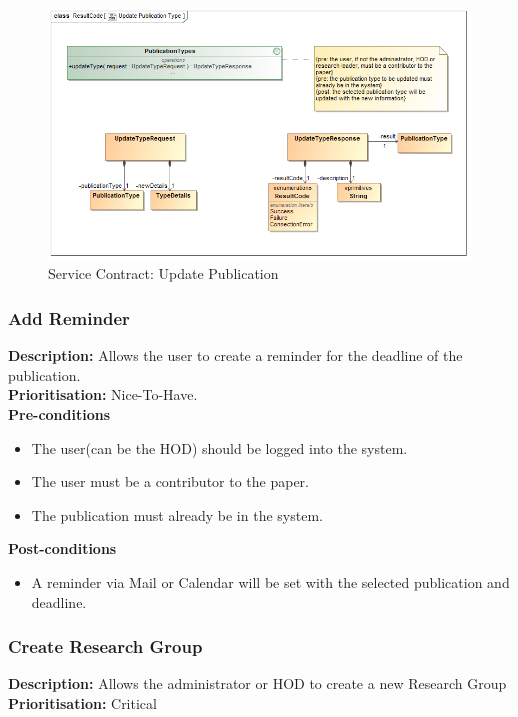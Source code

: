 \documentclass[a4paper]{article}
\begin{document}
            \begin{figure}[H]
            	\centering
            	\includegraphics[width=\textwidth]{5.1.9.Update.Publication.Type.Services.Contract.png}
            	\caption{Service Contract: Update Publication}
            \end{figure}
    
    \pagebreak
    \subsubsection{Add Reminder}
        \textbf{Description:} Allows the user to create a reminder for the deadline of the publication.\\
        \textbf{Prioritisation:} Nice-To-Have.
        \\
        
        \textbf{Pre-conditions}
        \begin{itemize}
        	\item The user(can be the HOD) should be logged into the system.
        	\item The user must be a contributor to the paper.
        	\item The publication must already be in the system.
        \end{itemize}
        
        \textbf{Post-conditions}
        \begin{itemize}
        	\item A reminder via Mail or Calendar will be set with the selected publication and deadline.
        \end{itemize}
    \pagebreak
	\subsubsection{Create Research Group}
	\textbf{Description:} Allows the administrator or HOD to create a new Research Group\\
	\textbf{Prioritisation:} Critical\\
	
\end{document}
